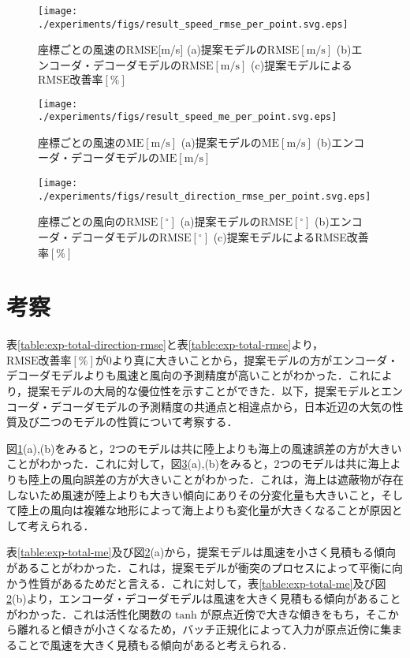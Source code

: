 \begin{figure}[bp]
  \centering
  \texttt{[image: ./experiments/figs/result\_speed\_rmse\_per\_point.svg.eps]}
  \caption{座標ごとの風速のRMSE[m/s] (a)提案モデルの$\mathrm{RMSE[m/s]}$ (b)エンコーダ・デコーダモデルの$\mathrm{RMSE[m/s]}$ (c)提案モデルによる$\mathrm{RMSE改善率[\%]}$}
  \label{fig:exp-speed-rmse-per-point}
\end{figure}

\begin{figure}[bp]
  \centering
  \texttt{[image: ./experiments/figs/result\_speed\_me\_per\_point.svg.eps]}
  \caption{座標ごとの風速の$\mathrm{ME[m/s]}$ (a)提案モデルの$\mathrm{ME[m/s]}$ (b)エンコーダ・デコーダモデルの$\mathrm{ME[m/s]}$}
  \label{fig:exp-speed-ma-per-point}
\end{figure}

\begin{figure}[bp]
  \centering
  \texttt{[image: ./experiments/figs/result\_direction\_rmse\_per\_point.svg.eps]}
  \caption{座標ごとの風向の$\mathrm{RMSE[^\circ]}$ (a)提案モデルの$\mathrm{RMSE[^\circ]}$ (b)エンコーダ・デコーダモデルの$\mathrm{RMSE[^\circ]}$ (c)提案モデルによるRMSE改善率$\mathrm{[\%]}$}
  \label{fig:exp-direction-rmse-per-point}
\end{figure}

\section{考察 \label{section:exp-discussion}}
表\ref{table:exp-total-direction-rmse}と表\ref{table:exp-total-rmse}より，$\mathrm{RMSE改善率[\%]}$が0より真に大きいことから，提案モデルの方がエンコーダ・デコーダモデルよりも風速と風向の予測精度が高いことがわかった．これにより，提案モデルの大局的な優位性を示すことができた．以下，提案モデルとエンコーダ・デコーダモデルの予測精度の共通点と相違点から，日本近辺の大気の性質及び二つのモデルの性質について考察する．

図\ref{fig:exp-speed-rmse-per-point}(a),(b)をみると，2つのモデルは共に陸上よりも海上の風速誤差の方が大きいことがわかった．これに対して，図\ref{fig:exp-direction-rmse-per-point}(a),(b)をみると，2つのモデルは共に海上よりも陸上の風向誤差の方が大きいことがわかった．これは，海上は遮蔽物が存在しないため風速が陸上よりも大きい傾向にありその分変化量も大きいこと，そして陸上の風向は複雑な地形によって海上よりも変化量が大きくなることが原因として考えられる．

表\ref{table:exp-total-me}及び図\ref{fig:exp-speed-ma-per-point}(a)から，提案モデルは風速を小さく見積もる傾向があることがわかった．これは，提案モデルが衝突のプロセスによって平衡に向かう性質があるためだと言える．これに対して，表\ref{table:exp-total-me}及び図\ref{fig:exp-speed-ma-per-point}(b)より，エンコーダ・デコーダモデルは風速を大きく見積もる傾向があることがわかった．これは活性化関数の$\tanh$が原点近傍で大きな傾きをもち，そこから離れると傾きが小さくなるため，バッチ正規化によって入力が原点近傍に集まることで風速を大きく見積もる傾向があると考えられる．

